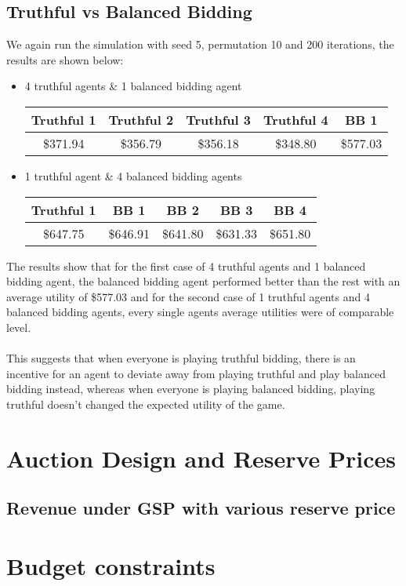 \documentclass[11pt]{article}
\begin{document}
\subsection{Truthful vs Balanced Bidding}
We again run the simulation with seed 5, permutation 10 and 200 iterations, the results are shown below:
\begin{itemize}
	\item 4 truthful agents \& 1 balanced bidding agent
		\begin{center}
		\begin{tabular}{| c | c | c | c | c | }
			\hline
			Truthful 1 & Truthful 2 & Truthful 3 & Truthful 4 & BB 1\\ \hline
			\$371.94 & \$356.79 & \$356.18 & \$348.80 & \$577.03 \\ \hline
		\end{tabular}
		\end{center}
	\item 1 truthful agent \& 4 balanced bidding agents
		\begin{center}
		\begin{tabular}{| c | c | c | c | c | }
			\hline
			Truthful 1 & BB 1 & BB 2 & BB 3 & BB 4 \\ \hline
			\$647.75 & \$646.91 & \$641.80 & \$631.33 & \$651.80 \\ \hline
		\end{tabular}
		\end{center}
\end{itemize}
The results show that for the first case of 4 truthful agents and 1 balanced bidding agent, the balanced bidding agent performed better than the rest with an average utility of \$577.03 and for the second case of 1 truthful agents and 4 balanced bidding agents, every single agents average utilities were of comparable level.
\\
\\
This suggests that when everyone is playing truthful bidding, there is an incentive for an agent to deviate away from playing truthful and play balanced bidding instead, whereas when everyone is playing balanced bidding, playing truthful doesn't changed the expected utility of the game.
\section{Auction Design and Reserve Prices}
\subsection{Revenue under GSP with various reserve price}
\section{Budget constraints}
\end{document}
